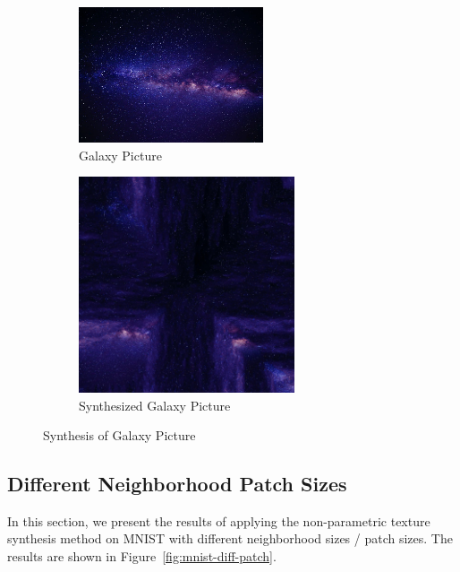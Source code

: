 \documentclass{article}
\begin{document}
\begin{figure}[H]
    \centering
    \begin{subfigure}[b]{0.49\textwidth}
        \centering
        \includegraphics[width=0.6\textwidth]{../Code/Textures/galaxy.png}
        \caption{Galaxy Picture}
        \label{fig:original-galaxy}
    \end{subfigure}
    \hfill %
    \begin{subfigure}[b]{0.49\textwidth}
        \centering
        \includegraphics[width=0.7\textwidth]{../Result/galaxy.png}
        \caption{Synthesized Galaxy Picture}
        \label{fig:synthesized-galaxy}
    \end{subfigure}
    \caption{Synthesis of Galaxy Picture}
    \label{fig:synthesis-galaxy}
\end{figure}

\subsection{Different Neighborhood Patch Sizes}
In this section, we present the results of applying the non-parametric texture synthesis method on MNIST with different neighborhood sizes / patch sizes.
The results are shown in Figure~\ref{fig:mnist-diff-patch}.
\end{document}
